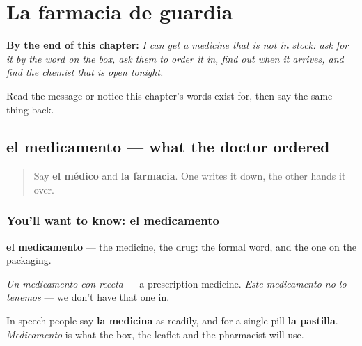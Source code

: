 
\chapter{La farmacia de guardia}
\label{ch:es-guardia}

\begin{chapteropening}
\textbf{By the end of this chapter:} \emph{I can get a medicine that is not in stock: ask for it by the word on the box, ask them to order it in, find out when it arrives, and find the chemist that is open tonight.}

Read the message or notice this chapter's words exist for, then say the same thing back.
\end{chapteropening}

\section[el medicamento]{el medicamento — what the doctor ordered}

\label{lesson:ES-C457-medicamento}



\begin{quote}
Say \textbf{el médico} and \textbf{la farmacia}. One writes it down, the other hands it over.
\end{quote}

\subsection*{You'll want to know: el medicamento}
\textbf{el medicamento} — the medicine, the drug: the formal word, and the one on the packaging.

\emph{Un medicamento con receta} — a prescription medicine. \emph{Este medicamento no lo tenemos} — we don't have that one in.

In speech people say \textbf{la medicina} as readily, and for a single pill \textbf{la pastilla}. \emph{Medicamento} is what the box, the leaflet and the pharmacist will use.

